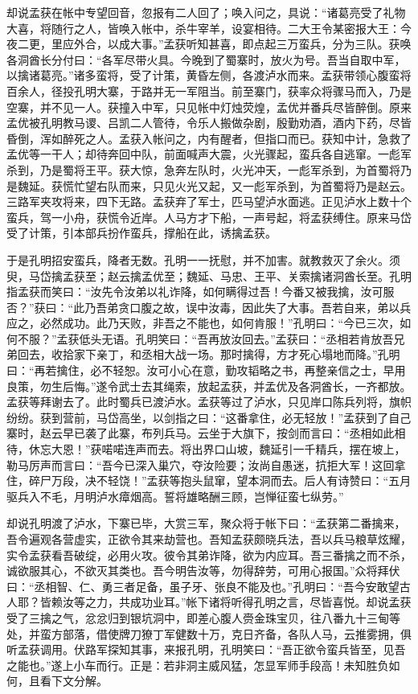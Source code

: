 却说孟获在帐中专望回音，忽报有二人回了；唤入问之，具说：“诸葛亮受了礼物大喜，将随行之人，皆唤入帐中，杀牛宰羊，设宴相待。二大王令某密报大王：今夜二更，里应外合，以成大事。”孟获听知甚喜，即点起三万蛮兵，分为三队。获唤各洞酋长分付曰：“各军尽带火具。今晚到了蜀寨时，放火为号。吾当自取中军，以擒诸葛亮。”诸多蛮将，受了计策，黄昏左侧，各渡泸水而来。孟获带领心腹蛮将百余人，径投孔明大寨，于路并无一军阻当。前至寨门，获率众将骤马而入，乃是空寨，并不见一人。获撞入中军，只见帐中灯烛荧煌，孟优并番兵尽皆醉倒。原来孟优被孔明教马谡、吕凯二人管待，令乐人搬做杂剧，殷勤劝酒，酒内下药，尽皆昏倒，浑如醉死之人。孟获入帐问之，内有醒者，但指口而已。获知中计，急救了孟优等一干人；却待奔回中队，前面喊声大震，火光骤起，蛮兵各自逃窜。一彪军杀到，乃是蜀将王平。获大惊，急奔左队时，火光冲天，一彪军杀到，为首蜀将乃是魏延。获慌忙望右队而来，只见火光又起，又一彪军杀到，为首蜀将乃是赵云。三路军夹攻将来，四下无路。孟获弃了军士，匹马望泸水面逃。正见泸水上数十个蛮兵，驾一小舟，获慌令近岸。人马方才下船，一声号起，将孟获缚住。原来马岱受了计策，引本部兵扮作蛮兵，撑船在此，诱擒孟获。

于是孔明招安蛮兵，降者无数。孔明一一抚慰，并不加害。就教救灭了余火。须臾，马岱擒孟获至；赵云擒孟优至；魏延、马忠、王平、关索擒诸洞酋长至。孔明指孟获而笑曰：“汝先令汝弟以礼诈降，如何瞒得过吾！今番又被我擒，汝可服否？”获曰：“此乃吾弟贪口腹之故，误中汝毒，因此失了大事。吾若自来，弟以兵应之，必然成功。此乃天败，非吾之不能也，如何肯服！”孔明曰：“今已三次，如何不服？”孟获低头无语。孔明笑曰：“吾再放汝回去。”孟获曰：“丞相若肯放吾兄弟回去，收拾家下亲丁，和丞相大战一场。那时擒得，方才死心塌地而降。”孔明曰：“再若擒住，必不轻恕。汝可小心在意，勤攻韬略之书，再整亲信之士，早用良策，勿生后悔。”遂令武士去其绳索，放起孟获，并孟优及各洞酋长，一齐都放。孟获等拜谢去了。此时蜀兵已渡泸水。孟获等过了泸水，只见岸口陈兵列将，旗帜纷纷。获到营前，马岱高坐，以剑指之曰：“这番拿住，必无轻放！”孟获到了自己寨时，赵云早已袭了此寨，布列兵马。云坐于大旗下，按剑而言曰：“丞相如此相待，休忘大恩！”获喏喏连声而去。将出界口山坡，魏延引一千精兵，摆在坡上，勒马厉声而言曰：“吾今已深入巢穴，夺汝险要；汝尚自愚迷，抗拒大军！这回拿住，碎尸万段，决不轻饶！”孟获等抱头鼠窜，望本洞而去。后人有诗赞曰：“五月驱兵入不毛，月明泸水瘴烟高。誓将雄略酬三顾，岂惮征蛮七纵劳。”

却说孔明渡了泸水，下寨已毕，大赏三军，聚众将于帐下曰：“孟获第二番擒来，吾令遍观各营虚实，正欲令其来劫营也。吾知孟获颇晓兵法，吾以兵马粮草炫耀，实令孟获看吾破绽，必用火攻。彼令其弟诈降，欲为内应耳。吾三番擒之而不杀，诚欲服其心，不欲灭其类也。吾今明告汝等，勿得辞劳，可用心报国。”众将拜伏曰：“丞相智、仁、勇三者足备，虽子牙、张良不能及也。”孔明曰：“吾今安敢望古人耶？皆赖汝等之力，共成功业耳。”帐下诸将听得孔明之言，尽皆喜悦。却说孟获受了三擒之气，忿忿归到银坑洞中，即差心腹人赍金珠宝贝，往八番九十三甸等处，并蛮方部落，借使牌刀獠丁军健数十万，克日齐备，各队人马，云推雾拥，俱听孟获调用。伏路军探知其事，来报孔明，孔明笑曰：“吾正欲令蛮兵皆至，见吾之能也。”遂上小车而行。正是：若非洞主威风猛，怎显军师手段高！未知胜负如何，且看下文分解。